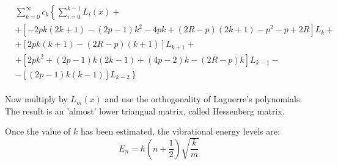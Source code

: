 \begin{equation}
\begin{split}
&  \sum_{k=0}^{\infty}c_k \left\{ \sum_{i = 0}^{k-1}{L_i(x)}  +  \right. \\[.8em] 
& + \left[ -2pk(2k+1) -(2p-1)k^2 -4pk +(2R-p)(2k+1) - p^2 -p + 2R \right]L_k + \\[.8em]
& + \left[2pk(k+1) - (2R-p)(k+1) \right]L_{k+1} + \\[.8em]
& + \left[2pk^2 + (2p-1)k(2k-1) + (4p-2)k - (2R-p)k \right]L_{k-1} - \\[.8em]
& \left. - \left[ (2p-1)k(k-1)  \right]L_{k-2}  \right\}
\end{split}
\end{equation}\\[1em]

Now multiply by $ L_m(x) $ and use the orthogonality of Laguerre's polynomials. The result is an 'almost' lower triangual matrix, called Hessenberg matrix.

Once the value of $ k $ has been estimated, the vibrational energy levels are:
\begin{equation}
E_n = \hbar\left(n + \frac{1}{2}\right)\sqrt{\frac{k}{m}}
\end{equation}




